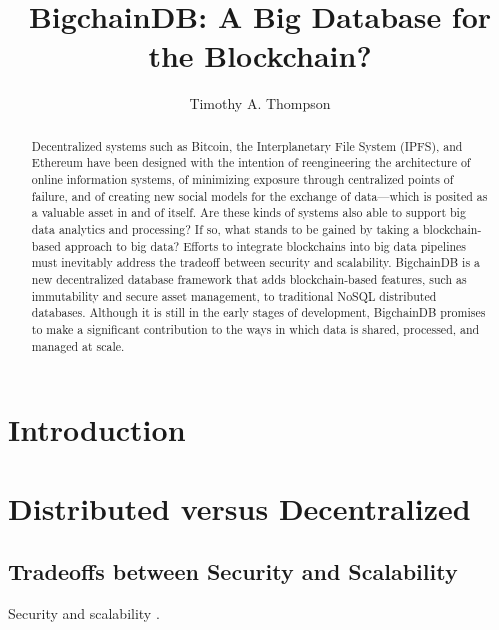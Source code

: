 \documentclass[sigconf]{acmart}
\begin{document}
\title{BigchainDB: A Big Database for the Blockchain?}
\author{Timothy A. Thompson}

\begin{abstract} 
Decentralized systems such as Bitcoin, the Interplanetary File System (IPFS), and Ethereum have been designed with the intention of reengineering the architecture of online information systems, of minimizing exposure through centralized points of failure, and of creating new social models for the exchange of data---which is posited as a valuable asset in and of itself. Are these kinds of systems also able to support big data analytics and processing? If so, what stands to be gained by taking a blockchain-based approach to big data? Efforts to integrate blockchains into big data pipelines must inevitably address the tradeoff between security and scalability. BigchainDB is a new decentralized database framework that adds blockchain-based features, such as immutability and secure asset management, to traditional NoSQL distributed databases. Although it is still in the early stages of development, BigchainDB promises to make a significant contribution to the ways in which data is shared, processed, and managed at scale.
\end{abstract}


\maketitle

\section{Introduction}

\section{Distributed versus Decentralized}

\subsection{Tradeoffs between Security and Scalability}
Security and scalability \cite{aA17, bigDB16, bigDB17a, bigDB17b, jC17, kB16, kC16, nM15, tMAI17, tMBD16, sR16}.
\end{document}
